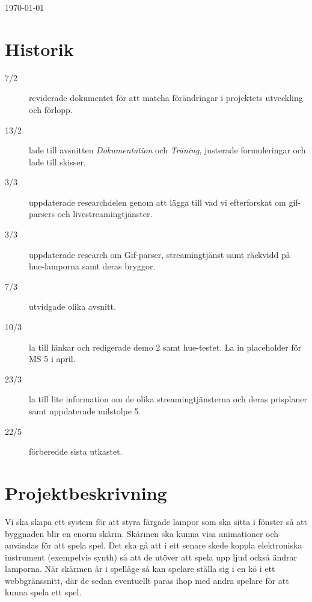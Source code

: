 \documentclass[a4paper,11pt]{article}
\begin{document}
\begin{titlepage}
\begin{center}
\vfill

{\large \today}

\end{center}
\end{titlepage}

\pagebreak
\section*{Historik}
  \begin{description}
    \item[7/2]  reviderade dokumentet för att matcha förändringar i projektets
                utveckling och förlopp.
    \item[13/2] lade till avsnitten \emph{Dokumentation} och
                \emph{Träning}, justerade formuleringar och lade till
                skisser.
    \item[3/3]  uppdaterade researchdelen genom att lägga till vad vi
                efterforskat om gif-parsers och livestreamingtjänster.
    \item[3/3]  uppdaterade research om Gif-parser, streamingtjänst samt
                räckvidd på hue-lamporna samt deras bryggor.
    \item[7/3]  utvidgade olika avsnitt.
    \item[10/3] la till länkar och redigerade demo 2 samt hue-testet. La in
                placeholder för MS 5 i april.
    \item[23/3] la till lite information om de olika streamingtjänsterna och
                deras prisplaner samt uppdaterade milstolpe 5.
    \item[22/5] förberedde sista utkastet.
  \end{description}

\pagebreak
\tableofcontents
\pagebreak

\pagestyle{fancy}


\section{Projektbeskrivning}

  Vi ska skapa ett system för att styra färgade lampor som ska sitta i
  fönster så att byggnaden blir en enorm skärm.  Skärmen ska kunna visa
  animationer och användas för att spela spel.  Det ska gå att i ett senare
  skede koppla elektroniska instrument (exempelvis synth) så att de utöver
  att spela upp ljud också ändrar lamporna.  När skärmen är i spelläge så kan
  spelare ställa sig i en kö i ett webbgränssnitt, där de sedan eventuellt
  paras ihop med andra spelare för att kunna spela ett spel.
\end{document}
